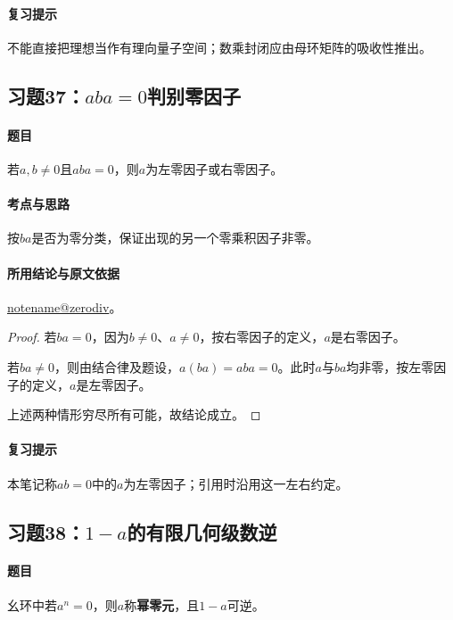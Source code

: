 \documentclass[UTF8,a4paper,11pt,fontset=windows]{ctexart}
\makeatletter
\newcommand{\noteref}[1]{\hyperref[note:#1]{\csname notename@#1\endcsname}}
\newcommand{\exref}[2]{\hyperref[ex:#1:#2]{第#1章习题#2}}
\makeatother
\begin{document}
\paragraph{复习提示}
不能直接把理想当作有理向量子空间；数乘封闭应由母环矩阵的吸收性推出。


\subsection{习题37：\texorpdfstring{$aba=0$判别零因子}{aba=0判别零因子}}
\label{ex:1:37}

\paragraph{题目}
若$a,b\neq0$且$aba=0$，则$a$为左零因子或右零因子。

\paragraph{考点与思路}
按$ba$是否为零分类，保证出现的另一个零乘积因子非零。

\paragraph{所用结论与原文依据}
\noteref{zerodiv}。


\begin{proof}
若$ba=0$，因为$b\ne0$、$a\ne0$，按右零因子的定义，$a$是右零因子。

若$ba\ne0$，则由结合律及题设，$a(ba)=aba=0$。此时$a$与$ba$均非零，按左零因子的定义，$a$是左零因子。

上述两种情形穷尽所有可能，故结论成立。
\end{proof}

\paragraph{复习提示}
本笔记称$ab=0$中的$a$为左零因子；引用时沿用这一左右约定。


\subsection{习题38：\texorpdfstring{$1-a$的有限几何级数逆}{1-a的有限几何级数逆}}
\label{ex:1:38}

\paragraph{题目}
幺环中若$a^n=0$，则$a$称\textbf{幂零元}，且$1-a$可逆。
\end{document}
